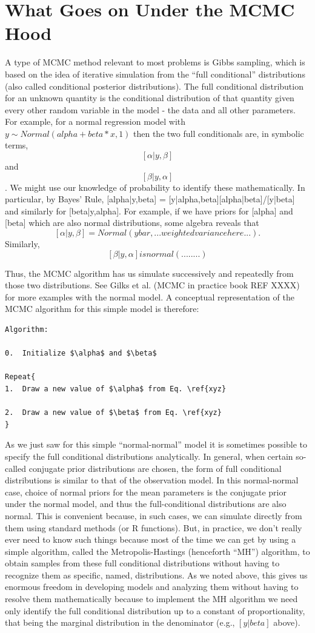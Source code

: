 \section{What Goes on Under the MCMC Hood}

A type of MCMC method relevant to most problems is Gibbs sampling, which is based on the idea of iterative simulation from the ``full conditional'' distributions (also called conditional posterior distributions). The full conditional distribution for an unknown quantity is the conditional distribution of that quantity given every other random variable in the model - the data and all other parameters. For example, for a normal regression model with $y \sim Normal(alpha + beta*x , 1)$ then the two full conditionals are, in symbolic terms,
\[ 
[\alpha|y,\beta]
\]
 and 
\[
[\beta|y,\alpha]
\]. 
We might use our knowledge of probability to identify these mathematically. In particular, by Bayes' Rule, [alpha|y,beta] = [y|alpha,beta][alpha|beta]/[y|beta] and similarly for [beta|y,alpha]. For example, if we have priors for [alpha] and [beta] which are also normal distributions, some algebra reveals that 
\[
[\alpha|y,\beta] = Normal(ybar,...weighted variance here...). 
\]
Similarly,
\[
 [\beta|y,\alpha] is normal(........) 
\]

Thus, the MCMC algorithm has us simulate successively and repeatedly from those two distributions. See Gilks et al. (MCMC in practice book REF XXXX) for more examples with the normal model. A conceptual representation of the MCMC algorithm for this simple model is therefore: 
\begin{verbatim}
Algorithm:

0.	Initialize $\alpha$ and $\beta$

Repeat{
1.	Draw a new value of $\alpha$ from Eq. \ref{xyz}

2.	Draw a new value of $\beta$ from Eq. \ref{xyz}
}
\end{verbatim}

As we just saw for this simple ``normal-normal'' model it is sometimes possible to specify the full conditional distributions analytically. In general, when certain so-called conjugate prior distributions are chosen, the form of full conditional distributions is similar to that of the observation model. In this normal-normal case, choice of normal priors for the mean parameters is the conjugate prior under the normal model, and thus the full-conditional distributions are also normal. This is convenient because, in such cases, we can simulate directly from them using standard methods (or R functions).  But, in practice,  we don't really ever need to know such things because most of the time we can get by using a simple algorithm, called the Metropolis-Hastings (henceforth ``MH'') algorithm, to obtain samples from these full conditional distributions without having to recognize them as specific, named, distributions. As we noted above, this gives us enormous freedom in developing models and analyzing them without having to resolve them mathematically because to implement the MH algorithm   we need only identify the full conditional distribution up to a constant of proportionality, that being the marginal distribution in the denominator (e.g., $[y|beta]$ above).


